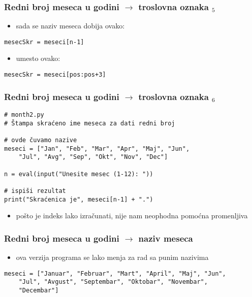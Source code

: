\documentclass[utf8,compress,aspectratio=169]{beamer}
\begin{document}
\begin{frame}[fragile]
  \frametitle{Redni broj meseca u godini $\rightarrow$ troslovna oznaka $_5$}
  \begin{itemize}
    \item sada se naziv meseca dobija ovako:
  \end{itemize}
\begin{verbatim}
mesecSkr = meseci[n-1]
\end{verbatim}
  \begin{itemize}
    \item umesto ovako:
  \end{itemize}
\begin{verbatim}
mesecSkr = meseci[pos:pos+3]
\end{verbatim}
\end{frame}

\begin{frame}[fragile,shrink=10]
  \frametitle{Redni broj meseca u godini $\rightarrow$ troslovna oznaka $_6$}
\begin{verbatim}
# month2.py
# Štampa skraćeno ime meseca za dati redni broj

# ovde čuvamo nazive
meseci = ["Jan", "Feb", "Mar", "Apr", "Maj", "Jun",
    "Jul", "Avg", "Sep", "Okt", "Nov", "Dec"]

n = eval(input("Unesite mesec (1-12): "))

# ispiši rezultat
print("Skraćenica je", meseci[n-1] + ".")
\end{verbatim}
  \begin{itemize}
    \item pošto je indeks lako izračunati, nije nam neophodna pomoćna promenljiva
  \end{itemize}
\end{frame}

\begin{frame}[fragile,shrink=10]
  \frametitle{Redni broj meseca u godini $\rightarrow$ naziv meseca}
  \begin{itemize}
    \item ova verzija programa se lako menja za rad sa punim nazivima
  \end{itemize}
\begin{verbatim}
meseci = ["Januar", "Februar", "Mart", "April", "Maj", "Jun",
    "Jul", "Avgust", "Septembar", "Oktobar", "Novembar",
    "Decembar"]
\end{verbatim}
\end{frame}
\end{document}
